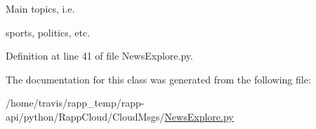 Main topics, i.\-e. 

sports, politics, etc. 

Definition at line 41 of file News\-Explore.\-py.



The documentation for this class was generated from the following file\-:\begin{DoxyCompactItemize}
\item 
/home/travis/rapp\-\_\-temp/rapp-\/api/python/\-Rapp\-Cloud/\-Cloud\-Msgs/\hyperlink{NewsExplore_8py}{News\-Explore.\-py}\end{DoxyCompactItemize}
